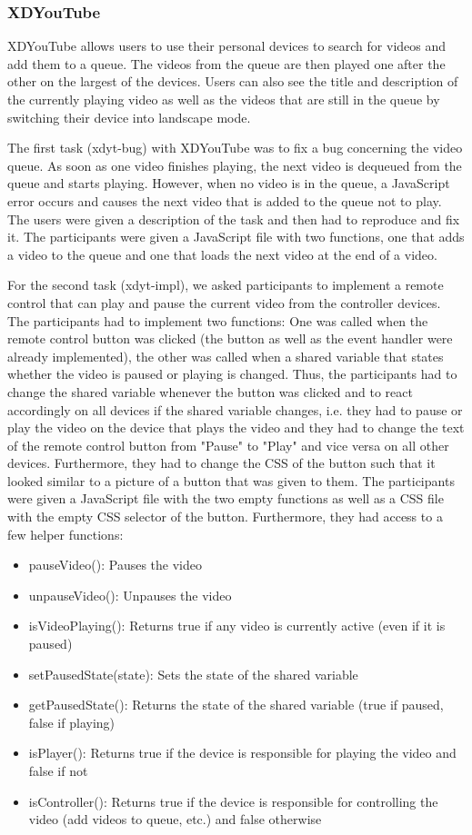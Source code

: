 \subsubsection{XDYouTube}
XDYouTube allows users to use their personal devices to search for videos and add them to a queue. The videos from the queue are then played one after the other on the largest of the devices. Users can also see the title and description of the currently playing video as well as the videos that are still in the queue by switching their device into landscape mode.

The first task (xdyt-bug) with XDYouTube was to fix a bug concerning the video queue. As soon as one video finishes playing, the next video is dequeued from the queue and starts playing. However, when no video is in the queue, a JavaScript error occurs and causes the next video that is added to the queue not to play. The users were given a description of the task and then had to reproduce and fix it.  The participants were given a JavaScript file with two functions, one that adds a video to the queue and one that loads the next video at the end of a video.

For the second task (xdyt-impl), we asked participants to implement a remote control that can play and pause the current video from the controller devices. The participants had to implement two functions: One was called when the remote control button was clicked (the button as well as the event handler were already implemented), the other was called when a shared variable that states whether the video is paused or playing is changed. Thus, the participants had to change the shared variable whenever the button was clicked and to react accordingly on all devices if the shared variable changes, i.e. they had to pause or play the video on the device that plays the video and they had to change the text of the remote control button from "Pause" to "Play" and vice versa on all other devices. Furthermore, they had to change the CSS of the button such that it looked similar to a picture of a button that was given to them. The participants were given a JavaScript file with the two empty functions as well as a CSS file with the empty CSS selector of the button. Furthermore, they had access to a few helper functions:
\begin{itemize}
	\item pauseVideo(): Pauses the video
	\item unpauseVideo(): Unpauses the video
	\item isVideoPlaying(): Returns true if any video is currently active (even if it is paused)
	\item setPausedState(state): Sets the state of the shared variable
	\item getPausedState(): Returns the state of the shared variable (true if paused, false if playing)
	\item isPlayer(): Returns true if the device is responsible for playing the video and false if not
	\item isController(): Returns true if the device is responsible for controlling the video (add videos to queue, etc.) and false otherwise
\end{itemize}


